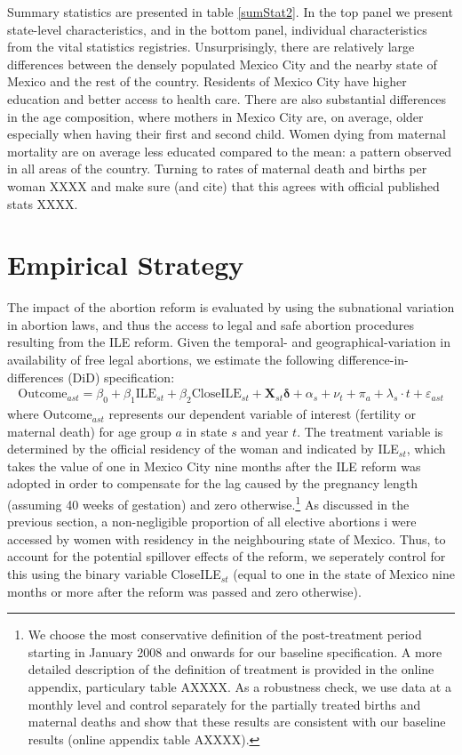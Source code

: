 \documentclass[a4paper, 11pt]{article}
\begin{document}
\begin{spacing}{2}
Summary statistics are presented in table \ref{sumStat2}.  In the top panel we present state-level characteristics, and in the bottom panel, individual characteristics from the vital statistics registries.  Unsurprisingly, there are relatively large differences between the densely populated Mexico City and the nearby state of Mexico and the rest of the country.  Residents of Mexico City have higher education and better access to health care. There are also substantial differences in the age composition, where mothers in Mexico City are, on average, older especially when having their first and second child.  Women dying from maternal mortality are on average less educated compared to the mean: a pattern observed in all areas of the country.  Turning to rates of maternal death and births per woman XXXX and make sure (and cite) that this agrees with official published stats XXXX.

\section{Empirical Strategy} \label{methodology}
The impact of the abortion reform is evaluated by using the subnational variation in abortion laws, and thus the access to legal and safe abortion procedures resulting from the ILE reform.  Given the temporal- and geographical-variation in availability of free legal abortions, we estimate the following difference-in-differences (DiD) specification:
\begin{eqnarray}\label{eq1}
	\text{Outcome}_{ast}= \beta_0 + \beta_1 \text{ILE}_{st} +\beta_2 \text{CloseILE}_{st}+ \bm{X}_{st}\bm{\delta} +\alpha_{s} + \nu_{t} +\pi_{a}+ \lambda_{s}\cdot t +\varepsilon_{ast}   
\end{eqnarray}
where Outcome$_{ast}$ represents our dependent variable of interest (fertility or maternal death) for age group $a$ in state $s$ and year $t$.  The treatment variable is determined by the official residency of the woman and indicated by ILE$_{st}$, which takes the value of one in Mexico City nine months after the ILE reform was adopted in order to compensate for the lag caused by the pregnancy length (assuming 40 weeks of gestation) and zero otherwise.\footnote{We choose the most conservative definition of the post-treatment period starting in January 2008 and onwards for our baseline specification. A more detailed description of the definition of treatment is provided in the online appendix, particulary table AXXXX.  As a robustness check, we use data at a monthly level and control separately for the partially treated births and maternal deaths and show that these results are consistent with our baseline results (online appendix table AXXXX).} As discussed in the previous section, a non-negligible proportion of all elective abortions i were accessed by women with residency in the neighbouring state of Mexico. Thus, to account for the potential spillover effects of the reform, we seperately control for this using the binary variable CloseILE$_{st}$ (equal to one in the state of Mexico nine months or more after the reform was passed and zero otherwise). 


\end{spacing}
\end{document}
